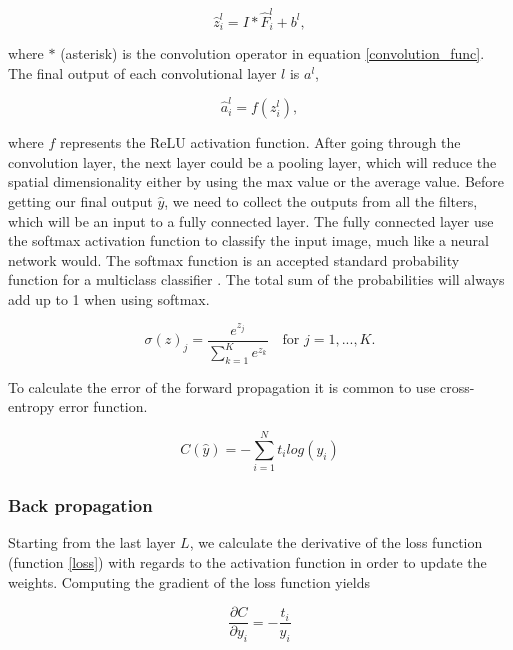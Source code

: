 \documentclass[english, a4paper]{article}
\begin{document}
\begin{equation}
    \hat{z}_i^l = I * \hat{F}_i^l + b^l, 
\end{equation}

where $*$ (asterisk) is the convolution operator in equation \ref{convolution_func}. The final output of each convolutional layer $l$ is $a^l$,

\begin{equation}
    \hat{a}_i^l = f(z_i^l), 
\end{equation}

where $f$ represents the ReLU activation function. After going through the convolution layer, the next layer could be a pooling layer, which will reduce the spatial dimensionality either by using the max value or the average value.
Before getting our final output $\hat{y}$, we need to collect the outputs from all the filters, which will be an input to a fully connected layer. 
The fully connected layer use the softmax activation function to classify the input image, much like a neural network would. The softmax function is an accepted standard probability function for a multiclass classifier \cite{NotesBackpropagation16}. The total sum of the probabilities will always add up to 1 when using softmax. 

\begin{equation} %
  \sigma(z)_j = \frac{e^{z_j}}{\sum_{k=1}^{K} e^{z_k}} \quad \text{for } j = 1, ..., K.
  \label{softmax}
\end{equation}

To calculate the error of the forward propagation it is common to use cross-entropy error function.

\begin{equation} %
  C(\hat{y}) = - \sum_{i=1}^N t_i log(y_i)
  \label{loss}
\end{equation}


\subsubsection{Back propagation}
Starting from the last layer $L$, we calculate the derivative of the loss function (function \ref{loss}) with regards to the activation function in order to update the weights. Computing the gradient of the loss function yields

\begin{equation}
  \frac{\partial C}{\partial y_i} = - \frac{t_i}{y_i}
\end{equation}
\end{document}
